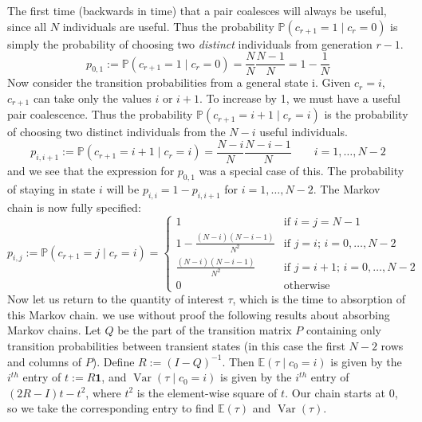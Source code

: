 \documentclass{article}
\newcommand{\E}{\mathbb{E}}
\newcommand{\PR}{\mathbb{P}}
\newcommand{\V}{\operatorname{Var}}
\begin{document}
The first time (backwards in time) that a pair coalesces will always be useful, since all $N$ individuals are useful. Thus the probability $\PR(c_{r+1} = 1 \mid c_r =0)$ is simply the probability of choosing two \emph{distinct} individuals from generation $r-1$.
\begin{equation*}
p_{0,1} := \PR(c_{r+1} = 1 \mid c_r =0) = \frac{N}{N}\frac{N-1}{N} = 1-\frac{1}{N}
\end{equation*}
Now consider the transition probabilities from a general state i.
Given $c_{r}=i$, $c_{r+1}$ can take only the values $i$ or $i+1$. To increase by 1, we must have a useful pair coalescence. Thus the probability $\PR(c_{r+1} = i+1 \mid c_r =i)$ is the probability of choosing two distinct individuals from the $N-i$ useful individuals.
\begin{equation*}
p_{i,i+1} := \PR(c_{r+1} = i+1 \mid c_r =i) = \frac{N-i}{N}\frac{N-i-1}{N} \qquad i=1,\dots,N-2
\end{equation*}
and we see that the expression for $p_{0,1}$ was a special case of this.
The probability of staying in state $i$ will be $p_{i,i} = 1-p_{i,i+1}$ for $i=1,\dots,N-2$. The Markov chain is now fully specified:
\begin{equation}\label{eq:moran_coal_transprob}
p_{i,j} := \PR(c_{r+1} = j \mid c_r =i) = 
\begin{cases}
  1 &\text{if } i=j=N-1 \\
  1-\frac{(N-i)(N-i-1)}{N^2} &\text{if } j=i;\, i=0,\dots,N-2 \\
  \frac{(N-i)(N-i-1)}{N^2} &\text{if } j=i+1;\, i=0,\dots,N-2 \\
  0 &\text{otherwise}
\end{cases}
\end{equation}
Now let us return to the quantity of interest $\tau$, which is the time to absorption of this Markov chain.
we use without proof the following results about absorbing Markov chains.
Let $Q$ be the part of the transition matrix $P$ containing only transition probabilities between transient states (in this case the first $N-2$ rows and columns of $P$). Define $R := (I-Q)^{-1}$.
Then $\E (\tau \mid c_0=i)$ is given by the $i^{th}$ entry of $t:=R\mathbf{1}$, and $\V(\tau \mid c_0=i)$ is given by the $i^{th}$ entry of $(2R-I)t-t^2$, where $t^2$ is the element-wise square of $t$. Our chain starts at 0, so we take the corresponding entry to find $\E(\tau)$ and $\V(\tau)$.
\end{document}
